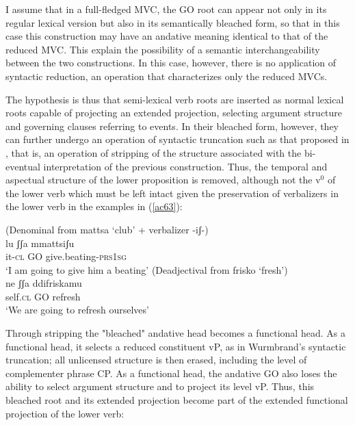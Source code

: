 \documentclass[output=paper]{langscibook}
\begin{document}
I assume that in a full-fledged MVC, the GO root can appear not only in its regular lexical version but also in its semantically bleached form, so that in this case this construction may have an andative meaning identical to that of the reduced MVC. This explain the possibility of a semantic interchangeability between the two constructions. In this case, however, there is no application of syntactic reduction, an operation that characterizes only the reduced MVCs.

The hypothesis is thus that semi-lexical verb roots are inserted as normal lexical roots capable of projecting an extended projection, selecting argument structure and governing clauses referring to events.  In their bleached form, however, they can further undergo an operation of syntactic truncation such as that proposed in \citet{wurmbrand2014a, wurmbrand2015, wurmbrand2017verb}, that is, an operation of stripping of the structure associated with the bi-eventual interpretation of the previous construction. Thus, the temporal and aspectual structure of the lower proposition is removed, although not the v$^0$ of the lower verb which must be left intact given the preservation of verbalizers in the lower verb in the examples in (\ref{ac63}):

\ea \label{ac63}
\ea (Denominal from mattsa ‘club’ + verbalizer -iʃ-)\label{ac63a}\\
\gll lu     ʃʃa  mmattsiʃu\\
     it-\textsc{cl} GO  give.beating-\textsc{prs}\textsc{1sg}\\
 \glt ‘I am going to give him a beating’
\ex (Deadjectival from frisko ‘fresh’)\\
\label{ac63b}\gll ne    ʃʃa   ddifriskamu\\
 self.\textsc{cl}  GO  refresh\\
 \glt ‘We are going to refresh ourselves’
    \z
\z

Through stripping the "bleached" andative head becomes a functional head. As a functional head, it selects a reduced constituent vP, as in Wurmbrand's syntactic truncation; all unlicensed structure is then erased, including the level of complementer  phrase CP. As a functional head, the andative GO also loses the ability to select argument structure and to project its level vP. Thus, this bleached root and its extended projection become part of the extended functional projection of the lower verb: 
\end{document}
